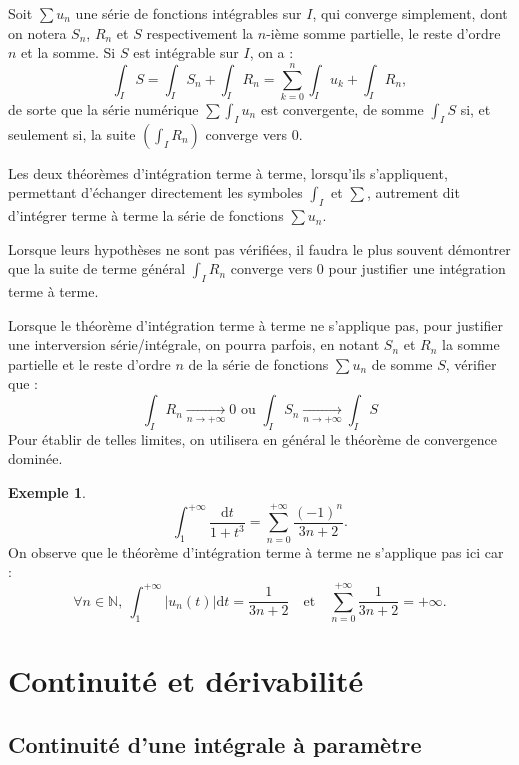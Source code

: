 \documentclass[french]{article}
\newcommand{\N}{\mathbb{N}}
\renewcommand{\d}{\text{d}}
\theoremstyle{plain}
\theoremstyle{definition}
\newtheorem*{ex}{Exemple}
\theoremstyle{remark}
\begin{document}
Soit $\displaystyle\sum u_n$ une série de fonctions intégrables sur $I$, qui converge simplement, dont on notera $S_n$, $R_n$ et $S$ respectivement la $n$-ième somme partielle, le reste d'ordre $n$ et la somme. Si $S$ est intégrable sur $I$, on a :
$$\int_I S=\int_I S_n+\int_I R_n=\sum_{k=0}^{n}\int_I u_k+\int_I R_n,$$ de sorte que la série numérique $\displaystyle\sum\int_I u_n$ est convergente, de somme $\int_I S$ si, et seulement si, la suite $\displaystyle\left(\int_I R_n\right)$ converge vers $0$.

Les deux théorèmes d'intégration terme à terme, lorsqu'ils s'appliquent, permettant d'échanger directement les symboles $\displaystyle\int_I$ et $\displaystyle\sum$, autrement dit d'intégrer terme à terme la série de fonctions $\displaystyle\sum u_n$.

Lorsque leurs hypothèses ne sont pas vérifiées, il faudra le plus souvent démontrer que la suite de terme général $\displaystyle\int_I R_n$ converge vers $0$ pour justifier une intégration terme à terme.

\begin{met}
	Lorsque le théorème d'intégration terme à terme ne s'applique pas, pour justifier une interversion série/intégrale, on pourra parfois, en notant $S_n$ et $R_n$ la somme partielle et le reste d'ordre $n$ de la série de fonctions $\sum u_n$ de somme $S$, vérifier que : $$\int_IR_n\xrightarrow[n\to+\infty]{}0 \text{  ou  }\int_IS_n\xrightarrow[n\to+\infty]{}\int_I S$$ Pour établir de telles limites, on utilisera en général le théorème de convergence dominée.
\end{met}

\begin{ex}
	$$\displaystyle\int_{1}^{+\infty}\frac{\d t}{1+t^3}=\sum_{n=0}^{+\infty}\frac{(-1)^n}{3n+2}.$$ On observe que le théorème d'intégration terme à terme ne s'applique pas ici car :
	$$\forall n\in\N,\ \int_{1}^{+\infty}\lvert u_n(t)\rvert\d t=\frac{1}{3n+2}\quad\text{et}\quad\sum_{n=0}^{+\infty}\frac{1}{3n+2}=+\infty.$$
\end{ex}

\section{Continuité et dérivabilité}

\subsection{Continuité d'une intégrale à paramètre}
\end{document}

